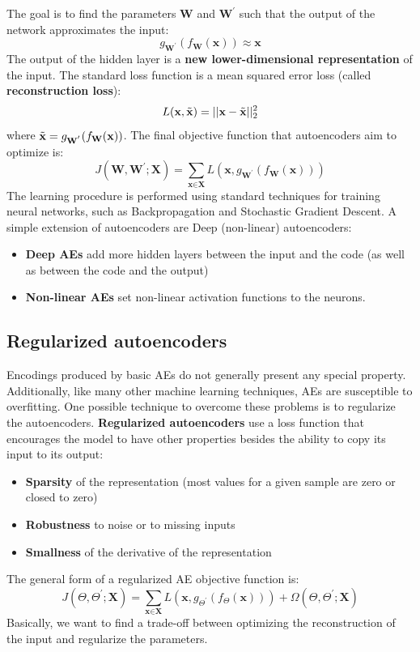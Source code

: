 The goal is to find the parameters $\textbf{W}$ and $\textbf{W}^{'}$ such that the output of the network approximates the input:
\[g_{\textbf{W}^{'}}(f_{\textbf{W}}(\textbf{x})) \approx \textbf{x}\]
The output of the hidden layer is a \textbf{new lower-dimensional representation} of the input.\newline\newline
The standard loss function is a mean squared error loss (called \textbf{reconstruction loss}):
\[L(\textbf{x}, \Tilde{\textbf{x}}) = ||\textbf{x} - \Tilde{\textbf{x}}||^{2}_{2}\]
where $\Tilde{\textbf{x}} = g_{\textbf{W}^{'}}(f_{\textbf{W}}(\textbf{x}))$. The final objective function that autoencoders aim to optimize is:
\[J(\textbf{W}, \textbf{W}^{'}; \textbf{X}) = \sum_{\textbf{x} \in \textbf{X}}L(\textbf{x}, g_{\textbf{W}^{'}}(f_{\textbf{W}}(\textbf{x})))\]
The learning procedure is performed using standard techniques for training neural networks, such as Backpropagation and Stochastic Gradient Descent.\newline\newline
A simple extension of autoencoders are Deep (non-linear) autoencoders:
\begin{itemize}
    \item \textbf{Deep AEs} add more hidden layers between the input and the code (as well as between the code and the output)
    \item \textbf{Non-linear AEs} set non-linear activation functions to the neurons.
\end{itemize}

\subsection{Regularized autoencoders}
Encodings produced by basic AEs do not generally present any special property. Additionally, like many other machine learning techniques, AEs are susceptible to overfitting. One possible technique to overcome these problems is to regularize the autoencoders.\newline\newline
\textbf{Regularized autoencoders} use a loss function that encourages the model to have other properties besides the ability to copy its input to its output:
\begin{itemize}
    \item \textbf{Sparsity} of the representation (most values for a given sample are zero or closed to zero)
    \item \textbf{Robustness} to noise or to missing inputs
    \item \textbf{Smallness} of the derivative of the representation
\end{itemize}
The general form of a regularized AE objective function is:
\[J(\Theta, \Theta^{'}; \textbf{X}) = \sum_{\textbf{x} \in \textbf{X}}L(\textbf{x}, g_{\Theta^{'}}(f_{\Theta}(\textbf{x}))) + \Omega(\Theta, \Theta^{'}; \textbf{X})\]
Basically, we want to find a trade-off between optimizing the reconstruction of the input and regularize the parameters.

